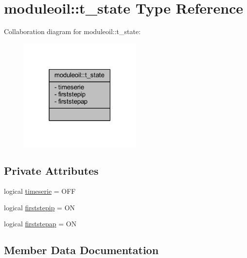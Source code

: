 \hypertarget{structmoduleoil_1_1t__state}{}\section{moduleoil\+:\+:t\+\_\+state Type Reference}
\label{structmoduleoil_1_1t__state}


Collaboration diagram for moduleoil\+:\+:t\+\_\+state\+:\nopagebreak
\begin{figure}[H]
\begin{center}
\leavevmode
\includegraphics[width=174pt]{structmoduleoil_1_1t__state__coll__graph}
\end{center}
\end{figure}
\subsection*{Private Attributes}
\begin{DoxyCompactItemize}
\item 
logical \mbox{\hyperlink{structmoduleoil_1_1t__state_a2f94c0a95e4bff738c3b7629701c2e2f}{timeserie}} = O\+FF
\item 
logical \mbox{\hyperlink{structmoduleoil_1_1t__state_acaa3fdbf5f7c2faffb0aa2ffe8c2e807}{firststepip}} = ON
\item 
logical \mbox{\hyperlink{structmoduleoil_1_1t__state_a1990af7f9b0908dedd533b8f0d650708}{firststepap}} = ON
\end{DoxyCompactItemize}


\subsection{Member Data Documentation}
\mbox{\label{structmoduleoil_1_1t__state_a1990af7f9b0908dedd533b8f0d650708}} 
